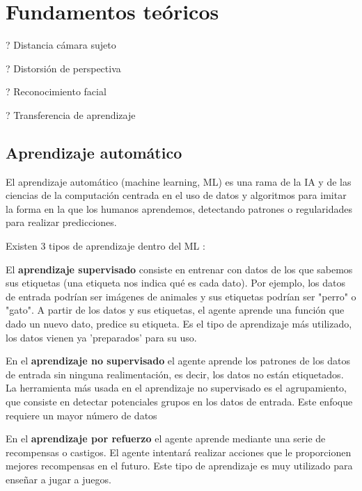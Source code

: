 \chapter{Fundamentos teóricos}
\thispagestyle{empty}

? Distancia cámara sujeto

? Distorsión de perspectiva

? Reconocimiento facial

? Transferencia de aprendizaje

\section{Aprendizaje automático}
El aprendizaje automático (machine learning, ML) \cite{16,17} es una rama de la IA y de las ciencias de la computación centrada en el uso de datos y algoritmos para imitar la forma en la que los humanos aprendemos, detectando patrones o regularidades para realizar predicciones.

Existen 3 tipos de aprendizaje dentro del ML \cite{18,19}:

El \textbf{aprendizaje supervisado} consiste en entrenar con datos de los que sabemos sus etiquetas (una etiqueta nos indica qué es cada dato). Por ejemplo, los datos de entrada podrían ser imágenes de animales y sus etiquetas podrían ser "perro" o "gato". A partir de los datos y sus etiquetas, el agente aprende una función que dado un nuevo dato, predice su etiqueta. Es el tipo de aprendizaje más utilizado, los datos vienen ya 'preparados' para su uso.

En el \textbf{aprendizaje no supervisado} el agente aprende los patrones de los datos de entrada sin ninguna realimentación, es decir, los datos no están etiquetados. La herramienta más usada en el aprendizaje no supervisado es el agrupamiento, que consiste en detectar potenciales grupos en los datos de entrada. Este enfoque requiere un mayor número de datos

En el \textbf{aprendizaje por refuerzo} el agente aprende mediante una serie de recompensas o castigos. El agente intentará realizar acciones que le proporcionen mejores recompensas en el futuro. Este tipo de aprendizaje es muy utilizado para enseñar a jugar a juegos.


